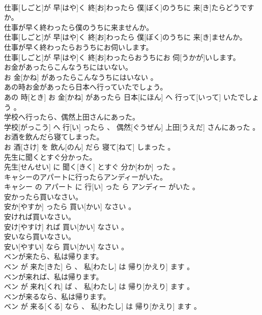 \documentclass[8pt]{extreport}
\begin{document}
\begin{CJK}{UTF8}{min}
\\	仕事[しごと]が 早[はや]く 終[お]わったら 僕[ぼく]のうちに 来[き]たらどうですか。
\\	仕事が早く終わったら僕のうちに来ませんか。	
\\	仕事[しごと]が 早[はや]く 終[お]わったら 僕[ぼく]のうちに 来[き]ませんか。
\\	仕事が早く終わったらおうちにお伺いします。	
\\	仕事[しごと]が 早[はや]く 終[お]わったらおうちにお 伺[うかが]いします。
\\	お金があったらこんなうちにはいない。	
\\	お 金[かね] があったらこんなうちにはいない 。
\\	あの時お金があったら日本へ行っていたでしょう。	
\\	あの 時[とき] お 金[かね] があったら 日本[にほん] へ 行って[いって] いたでしょう 。
\\	学校へ行ったら、偶然上田さんにあった。	
\\	学校[がっこう] へ 行[い] ったら 、 偶然[ぐうぜん] 上田[うえだ] さんにあった 。
\\	お酒を飲んだら寝てしまった。	
\\	お 酒[さけ] を 飲ん[のん] だら 寝て[ねて] しまった 。
\\	先生に聞くとすぐ分かった。	
\\	先生[せんせい] に 聞く[きく] とすぐ 分か[わか] った 。
\\	キャシーのアパートに行ったらアンディーがいた。	
\\	キャシー の アパート に 行[い] った ら アンディー がいた 。
\\	安かったら買いなさい。	
\\	安か[やすか] ったら 買い[かい] なさい 。
\\	安ければ買いなさい。	
\\	安け[やすけ] れば 買い[かい] なさい 。
\\	安いなら買いなさい。	
\\	安い[やすい] なら 買い[かい] なさい 。
\\	ベンが来たら、私は帰ります。	
\\	ベン が 来た[きた] ら 、 私[わたし] は 帰り[かえり] ます 。
\\	ベンが来れば、私は帰ります。	
\\	ベン が 来れ[くれ] ば 、 私[わたし] は 帰り[かえり] ます 。
\\	ベンが来るなら、私は帰ります。	
\\	ベン が 来る[くる] なら 、 私[わたし] は 帰り[かえり] ます 。

\end{CJK}
\end{document}
